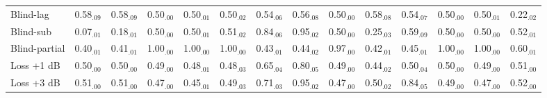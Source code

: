 \begin{tabular}{lccccccccccccc}
Blind-lag & 0.58$_{.09}$ & 0.58$_{.09}$ & 0.50$_{.00}$ & 0.50$_{.01}$ & 0.50$_{.02}$ & 0.54$_{.06}$ & 0.56$_{.08}$ & 0.50$_{.00}$ & 0.58$_{.08}$ & 0.54$_{.07}$ & 0.50$_{.00}$ & 0.50$_{.01}$ & 0.22$_{.02}$\\
Blind-sub & 0.07$_{.01}$ & 0.18$_{.01}$ & 0.50$_{.00}$ & 0.50$_{.01}$ & 0.51$_{.02}$ & 0.84$_{.06}$ & 0.95$_{.02}$ & 0.50$_{.00}$ & 0.25$_{.03}$ & 0.59$_{.09}$ & 0.50$_{.00}$ & 0.50$_{.00}$ & 0.52$_{.01}$\\
Blind-partial & 0.40$_{.01}$ & 0.41$_{.01}$ & 1.00$_{.00}$ & 1.00$_{.00}$ & 1.00$_{.00}$ & 0.43$_{.01}$ & 0.44$_{.02}$ & 0.97$_{.00}$ & 0.42$_{.01}$ & 0.45$_{.01}$ & 1.00$_{.00}$ & 1.00$_{.00}$ & 0.60$_{.01}$\\
Loss +1 dB & 0.50$_{.00}$ & 0.50$_{.00}$ & 0.49$_{.00}$ & 0.48$_{.01}$ & 0.48$_{.03}$ & 0.65$_{.04}$ & 0.80$_{.05}$ & 0.49$_{.00}$ & 0.44$_{.02}$ & 0.50$_{.04}$ & 0.50$_{.00}$ & 0.49$_{.00}$ & 0.51$_{.00}$\\
Loss +3 dB & 0.51$_{.00}$ & 0.51$_{.00}$ & 0.47$_{.00}$ & 0.45$_{.01}$ & 0.49$_{.03}$ & 0.71$_{.03}$ & 0.95$_{.02}$ & 0.47$_{.00}$ & 0.50$_{.02}$ & 0.84$_{.05}$ & 0.49$_{.00}$ & 0.47$_{.00}$ & 0.52$_{.00}$\\
\hline
\end{tabular}